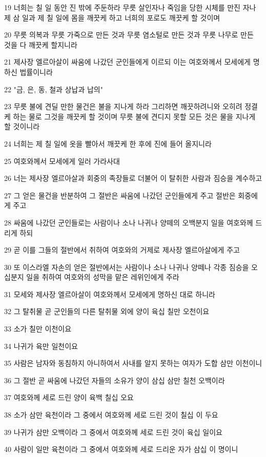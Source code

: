 \par 19 너희는 칠 일 동안 진 밖에 주둔하라 무릇 살인자나 죽임을 당한 시체를 만진 자나 제 삼 일과 제 칠 일에 몸을 깨끗케 하고 너희의 포로도 깨끗케 할 것이며
\par 20 무릇 의복과 무릇 가죽으로 만든 것과 무릇 염소털로 만든 것과 무릇 나무로 만든 것을 다 깨끗케 할지니라
\par 21 제사장 엘르아살이 싸움에 나갔던 군인들에게 이르되 이는 여호와께서 모세에게 명하신 법률이니라
\par 22 "금, 은, 동, 철과 상납과 납의"
\par 23 무릇 불에 견딜 만한 물건은 불을 지나게 하라 그리하면 깨끗하려니와 오히려 정결케 하는 물로 그것을 깨끗케 할 것이며 무릇 불에 견디지 못할 모든 것은 물을 지나게 할 것이니라
\par 24 너희는 제 칠 일에 옷을 빨아서 깨끗케 한 후에 진에 들어 올지니라
\par 25 여호와께서 모세에게 일러 가라사대
\par 26 너는 제사장 엘르아살과 회중의 족장들로 더불어 이 탈취한 사람과 짐승을 계수하고
\par 27 그 얻은 물건을 반분하여 그 절반은 싸움에 나갔던 군인들에게 주고 절반은 회중에게 주고
\par 28 싸움에 나갔던 군인들로는 사람이나 소나 나귀나 양떼의 오백분지 일을 여호와께 드리게 하되
\par 29 곧 이를 그들의 절반에서 취하여 여호와의 거제로 제사장 엘르아살에게 주고
\par 30 또 이스라엘 자손의 얻은 절반에서는 사람이나 소나 나귀나 양떼나 각종 짐승을 오십분지 일을 취하여 여호와의 성막을 맡은 레위인에게 주라
\par 31 모세와 제사장 엘르아살이 여호와께서 모세에게 명하신 대로 하니라
\par 32 그 탈취물 곧 군인들의 다른 탈취물 외에 양이 육십 칠만 오천이요
\par 33 소가 칠만 이천이요
\par 34 나귀가 육만 일천이요
\par 35 사람은 남자와 동침하지 아니하여서 사내를 알지 못하는 여자가 도합 삼만 이천이니
\par 36 그 절반 곧 싸움에 나갔던 자들의 소유가 양이 삼십 삼만 칠천 오백이라
\par 37 여호와께 세로 드린 양이 육백 칠십 오요
\par 38 소가 삼만 육천이라 그 중에서 여호와께 세로 드린 것이 칠십 이 두요
\par 39 나귀가 삼만 오백이라 그 중에서 여호와께 세로 드린 것이 육십 일이요
\par 40 사람이 일만 육천이라 그 중에서 여호와께 세로 드리운 자가 삼십 이 명이니

